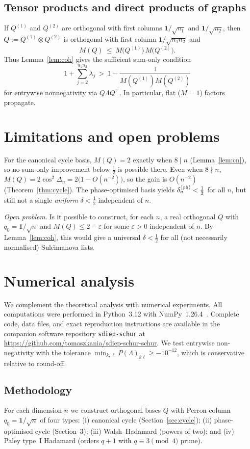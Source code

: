 \documentclass[12pt,fleqn]{amsart}
\renewcommand{\le}{\leqslant}
\renewcommand{\ge}{\geqslant}
\theoremstyle{remark}
\newcommand{\1}{\mathbf{1}}
\newcommand{\Lam}{\Lambda}
\begin{document}
\subsection*{Tensor products and direct products of graphs}
If $Q^{(1)}$ and $Q^{(2)}$ are orthogonal with first columns $\1/\sqrt{n_1}$ and $\1/\sqrt{n_2}$, then $Q:=Q^{(1)}\otimes Q^{(2)}$ is orthogonal with first column $\1/\sqrt{n_1n_2}$ and
\[
M(Q)\ \le\ M\!\big(Q^{(1)}\big)\,M\!\big(Q^{(2)}\big).
\]
Thus Lemma~\ref{lem:coh} gives the sufficient sum-only condition
\[
1+\sum_{j=2}^{n_1n_2}\lambda_j\ >\ 1-\frac{1}{M(Q^{(1)})M(Q^{(2)})}
\]
for entrywise nonnegativity via $Q\Lam Q^\top$. In particular, flat ($M=1$) factors propagate.

\section{Limitations and open problems}

For the canonical cycle basis, $M(Q)=2$ exactly when $8\mid n$ (Lemma~\ref{lem:cn}), so no sum-only improvement below $\tfrac12$ is possible there. Even when $8\nmid n$, $M(Q)=2\cos^2\Delta_n=2\bigl(1-O(n^{-2})\bigr)$, so the gain is $O(n^{-2})$ (Theorem~\ref{thm:cycle}). The phase-optimised basis yields $\delta_n^{\rm (ph)}<\tfrac12$ for all $n$, but still not a single \emph{uniform} $\delta<\tfrac12$ independent of $n$.

\medskip
\noindent\emph{Open problem.} Is it possible to construct, for each $n$, a real orthogonal $Q$ with $q_0=\1/\sqrt n$ and $M(Q)\le 2-\varepsilon$ for some $\varepsilon>0$ independent of $n$. By Lemma~\ref{lem:coh}, this would give a universal $\delta<\tfrac12$ for all (not necessarily normalised) Sule\u{\i}manova lists.

\section{Numerical analysis}\label{sec:numerics}

We complement the theoretical analysis with numerical experiments. All computations were performed in Python~3.12 with NumPy~1.26.4~\cite{numpy}. Complete code, data files, and exact reproduction instructions are available in the companion software repository \texttt{sdiep-schur} at \url{https://github.com/tomaszkania/sdiep-schur-schur}. We test entrywise non-negativity with the tolerance $\min_{k,\ell} P(\Lambda)_{k\ell}\ge -10^{-12}$, which is conservative relative to round-off.

\subsection{Methodology}
For each dimension $n$ we construct orthogonal bases $Q$ with Perron column $q_0=\mathbf{1}/\sqrt n$ of four types: (i) canonical cycle (Section~\ref{sec:cycle}); (ii) phase-optimised cycle (Section~3); (iii) Walsh--Hadamard (powers of two); and (iv) Paley type~I Hadamard (orders $q+1$ with $q\equiv3\pmod4$ prime). 
\end{document}
